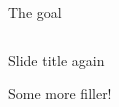 \documentclass[11pt]{beamer}
\begin{document}
\begin{frame}{The goal}
\begin{columns}
\begin{column}{0.5\textwidth}
\end{column}
	
\end{columns}

\end{frame}


\begin{frame}{Slide title again}
	
	Some more filler!
	
\end{frame}


%
%
%

\end{document}
